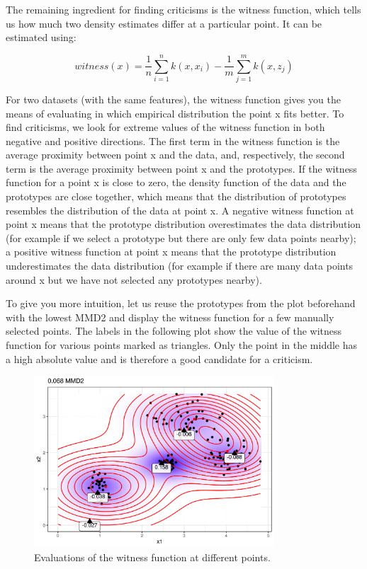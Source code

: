 \documentclass[
  10pt,
]{scrbook}
\begin{document}
The remaining ingredient for finding criticisms is the witness function, which tells us how much two density estimates differ at a particular point.
It can be estimated using:

\[witness(x)=\frac{1}{n}\sum_{i=1}^nk(x,x_i)-\frac{1}{m}\sum_{j=1}^mk(x,z_j)\]

For two datasets (with the same features), the witness function gives you the means of evaluating in which empirical distribution the point x fits better.
To find criticisms, we look for extreme values of the witness function in both negative and positive directions.
The first term in the witness function is the average proximity between point x and the data, and, respectively, the second term is the average proximity between point x and the prototypes.
If the witness function for a point x is close to zero, the density function of the data and the prototypes are close together, which means that the distribution of prototypes resembles the distribution of the data at point x.
A negative witness function at point x means that the prototype distribution overestimates the data distribution (for example if we select a prototype but there are only few data points nearby);
a positive witness function at point x means that the prototype distribution underestimates the data distribution (for example if there are many data points around x but we have not selected any prototypes nearby).

To give you more intuition, let us reuse the prototypes from the plot beforehand with the lowest MMD2 and display the witness function for a few manually selected points.
The labels in the following plot show the value of the witness function for various points marked as triangles.
Only the point in the middle has a high absolute value and is therefore a good candidate for a criticism.

\begin{figure}

{\centering \includegraphics[width=0.8\textwidth]{images/witness-1} 

}

\caption{Evaluations of the witness function at different points.}\label{fig:witness}
\end{figure}
\end{document}
